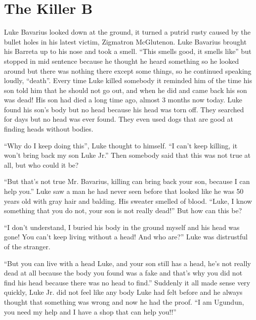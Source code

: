 \chapter{The Killer B}





Luke Bavarius looked down at the ground, it turned a putrid rusty
caused by the bullet holes in his latest victim, Zigmatron
McGlutenon. Luke Bavarius brought his Barreta up to his nose and
took a smell. ``This smells good, it smells like'' but
stopped in mid sentence because he thought he heard something so he
looked around but there was nothing there except some things, so he
continued speaking loudly, ``death''. Every time Luke
killed somebody it reminded him of the time his son told him that
he should not go out, and when he did and came back his son was
dead! His son had died a long time ago, almost 3 months now today.
Luke found his son's body but no head because his head was torn
off. They searched for days but no head was ever found. They even
used dogs that are good at finding heads without bodies.



``Why do I keep doing this'', Luke thought to himself.
``I can't keep killing, it won't bring back my son Luke
Jr.'' Then somebody said that this was not true at all, but
who could it be?



``But that's not true Mr. Bavarius, killing can bring back
your son, because I can help you.'' Luke saw a man he had
never seen before that looked like he was 50 years old with gray
hair and balding. His sweater smelled of blood. ``Luke, I know
something that you do not, your son is not really dead!'' But
how can this be?



``I don't understand, I buried his body in the ground myself
and his head was gone! You can't keep living without a head! And
who are?'' Luke was distrustful of the stranger.



``But you can live with a head Luke, and your son still has a
head, he's not really dead at all because the body you found was a
fake and that's why you did not find his head because there was no
head to find.'' Suddenly it all made sense very quickly, Luke
Jr. did not feel like any body Luke had felt before and he always
thought that something was wrong and now he had the proof. ``I
am Ugundun, you need my help and I have a shop that can help
you!!''



